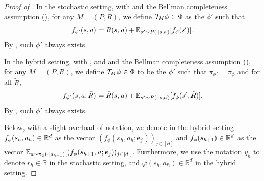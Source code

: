 \begin{proof}[Proof of ] 


In the stochastic setting, %
with  and the Bellman completeness assumption (), for any $M=(P,R)$, we define $\mathcal{T}_M \phi\in\Phi$ as the $\phi'$ such that 
\begin{align*}
f_{\phi'}(s,a) = R(s,a) + \mathbb{E}_{s'\sim P(\cdot|s,a)}[f_\phi(s')]. 
\end{align*}
By , such $\phi'$ always exists. 

In the hybrid setting, with ,  and  and the Bellman completeness assumption (), for any $M=(P,R)$, we define $\mathcal{T}_M\phi\in\Phi$ to be the $\phi'$ such that $\pi_{\phi'}=\pi_\phi$ and for all $\tilde{R}$, 
\begin{align*}
    f_{\phi'}(s,a; \tilde{R}) = \tilde{R}(s,a) + \mathbb{E}_{s'\sim P(\cdot|s,a)}[f_\phi(s';\tilde{R})]. 
\end{align*}
By , such $\phi'$ always exists. 

Below, with a slight overload of notation, we denote
in the hybrid setting $f_{\phi}(s_h,a_h)\in\mathbb{R}^{d}$ as the vector $(f_{\phi}(s_h,a_h;\bm{e}_j))_{j\in[d]}$ and $f_{\phi}(s_{h+1})\in\mathbb{R}^{d}$ as the vector $\mathbb{E}_{a\sim\pi_{\phi}(\cdot|s_{h+1})}[(f_{\phi}(s_{h+1},a;\bm{e}_j))_{j\in[d]}]$. Furthermore, we use the notation $y_h$ to denote $r_h\in\mathbb{R}$ in the stochastic setting, and $\varphi(s_h,a_h)\in\mathbb{R}^d$ in the hybrid setting. 


\end{proof}
